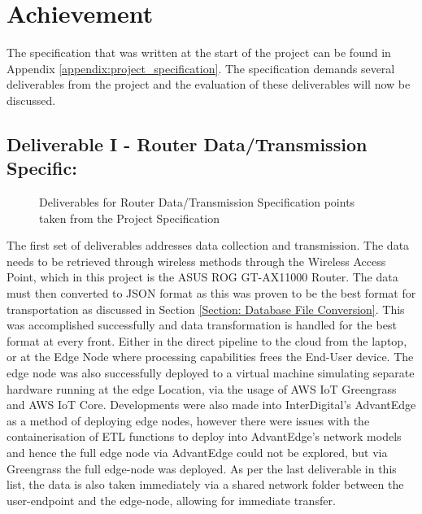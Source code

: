 \section{Achievement} 
The specification that was written at the start of the project can be found in Appendix \ref{appendix:project_specification}. The specification demands several deliverables from the project and the evaluation of these deliverables will now be discussed.

\subsection{Deliverable I - Router Data/Transmission Specific:}
\begin{figure}[ht]
    \centering
    \caption{Deliverables for Router Data/Transmission Specification points taken from the Project Specification}
    \label{fig:router_data_deliverables}
\end{figure}

The first set of deliverables addresses data collection and transmission. The data needs to be retrieved through wireless methods through the Wireless Access Point, which in this project is the  ASUS ROG GT-AX11000 Router. The data must then converted to JSON format as this was proven to be the best format for transportation as discussed in Section \ref{Section: Database File Conversion}. This was accomplished successfully and data transformation is handled for the best format at every front. Either in the direct pipeline to the cloud from the laptop, or at the Edge Node where processing capabilities frees the End-User device. The edge node was also successfully deployed to a virtual machine simulating separate hardware running at the edge Location, via the usage of AWS IoT Greengrass and AWS IoT Core. Developments were also made into InterDigital's AdvantEdge as a method of deploying edge nodes, however there were issues with the containerisation of ETL functions to deploy into AdvantEdge's network models and hence the full edge node via AdvantEdge could not be explored, but via Greengrass the full edge-node was deployed. As per the last deliverable in this list, the data is also taken immediately via a shared network folder between the user-endpoint and the edge-node, allowing for immediate transfer.

